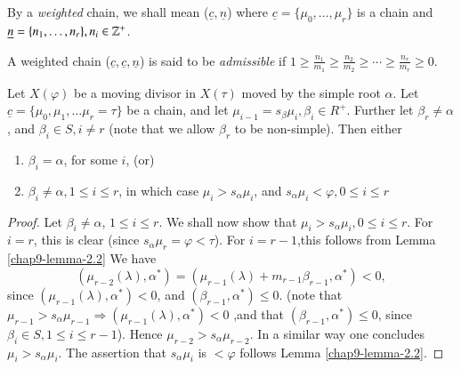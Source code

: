 \begin{definition}\label{chap9-definition-3.3}
By a \textit{weighted} chain, we shall mean ($\underline{c}, \underline{n}$) where $\underline{c}= \{ \mu_{0}, \ldots, \mu_{r}\}$ is a chain and $\underline{n} = \{ n_{1}, \ldots, n_{r}\}, n_{i} \in \mathbb{Z}^{+}$.
\end{definition}

\begin{definition}\label{chap9-definition-3.4}
A weighted chain ($\underline{c}, \underline{c}, \underline{n} $) is said to be \textit{admissible} if $1 \geq \frac{n_{1}}{m_{1}}\geq \frac{n_{2}}{m_{2}}\geq \cdots \geq \frac{n_{r}}{m_{r}}\geq 0$.
\end{definition}

\begin{seclem}\label{chap9-lemma-3.5}
Let $X(\varphi)$ be a moving divisor in $X(\tau)$ moved by the simple root $\alpha$. Let $\underline{c} = \{\mu_{0}, \mu_{1}, \ldots \mu_{r} = \tau\}$ be a chain, and let $\mu_{i-1} = s_{\beta}\mu_{i}, \beta_{i} \in R^{+}$. Further let
$\beta_{r} \neq \alpha$, and $\beta_{i} \in S, i\neq r$ (note that we allow $\beta_{r}$ to be non-simple). Then either
\begin{enumerate}[(1)]
\item $\beta_{i}=\alpha$, for some $i$, {\rm(or)}\label{chap9-lemma3.5-enum-1}
\item $\beta_{i} \neq \alpha, 1 \leq i \leq r$, in which case $\mu_{i} > s_{\alpha}\mu_{i}$, and $s_{\alpha}\mu_{i} < \varphi, 0 \leq i \leq r$\label{chap9-lemma3.5-enum-2}
\end{enumerate}
\end{seclem}

\begin{proof}
Let $\beta_{i} \neq \alpha$, $ 1 \leq i \leq r$. We shall now show that $ \mu_{i} > s_{\alpha}\mu_{i}, 0 \leq i \leq r$.
For $i=r$, this is clear (since $s_{\alpha}\mu_{r}= \varphi < \tau$). For $i=r-1$,this follows from Lemma
\ref{chap9-lemma-2.2} We have
$$
(\mu_{r-2}(\lambda), \alpha^{*})= (\mu_{r-1}(\lambda)+ m_{r-1} \beta_{r-1}, \alpha^{*})< 0,
$$
since $(\mu_{r-1}(\lambda), \alpha^{*})< 0$, and $(\beta_{r-1}, \alpha^{*})\leq 0$. (note that $\mu_{r-1} > s_{\alpha}\mu_{r-1} \Rightarrow (\mu_{r-1}(\lambda), \alpha^{*})< 0$ ,and that $(\beta_{r-1}, \alpha^{*})\leq 0$, since $\beta_{i} \in S, 1\leq i \leq r-1$). Hence $\mu_{r-2} > s_{\alpha}\mu_{r-2}$. In a similar way one concludes $\mu_{i} > s_{\alpha}\mu_{i}$. The assertion that $s_{\alpha}\mu_{i}$ is $< \varphi$ follows Lemma \ref{chap9-lemma-2.2}.
\end{proof}

